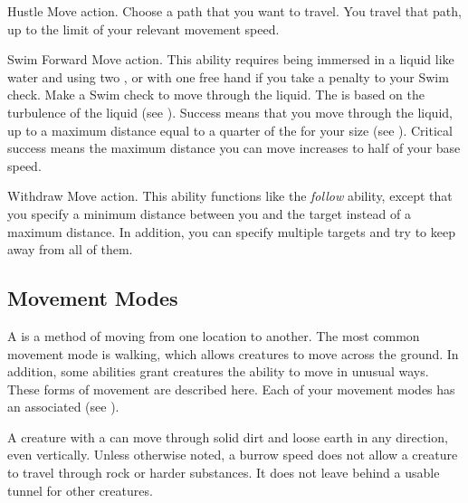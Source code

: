     \begin{activeability}{Hustle}
      \abilityusagetime Move action.
      \rankline
      Choose a path that you want to travel.
      You travel that path, up to the limit of your relevant movement speed.
    \end{activeability}

    \begin{activeability}{Swim Forward}
      \abilityusagetime Move action.
      \rankline
      This ability requires being immersed in a liquid like water and using two , or with one free hand if you take a  penalty to your Swim check.
      Make a Swim check to move through the liquid.
      The  is based on the turbulence of the liquid (see ).
      Success means that you move through the liquid, up to a maximum distance equal to a quarter of the  for your size (see ).
      Critical success means the maximum distance you can move increases to half of your base speed.
    \end{activeability}

    \begin{activeability}{Withdraw}
      \abilityusagetime Move action.
      \rankline
      This ability functions like the \textit{follow} ability, except that you specify a minimum distance between you and the target instead of a maximum distance.
      In addition, you can specify multiple targets and try to keep away from all of them.
    \end{activeability}

  \subsection{Movement Modes}\label{Movement Modes}
    A  is a method of moving from one location to another.
    The most common movement mode is walking, which allows creatures to move across the ground.
    In addition, some abilities grant creatures the ability to move in unusual ways.
    These forms of movement are described here.
    Each of your movement modes has an associated  (see ).

    A creature with a  can move through solid dirt and loose earth in any direction, even vertically.
    Unless otherwise noted, a burrow speed does not allow a creature to travel through rock or harder substances.
    It does not leave behind a usable tunnel for other creatures.

